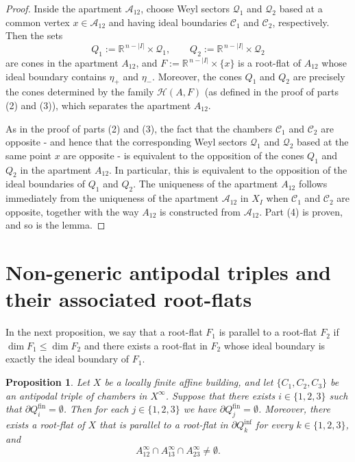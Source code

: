 \documentclass[11pt]{amsart}
\theoremstyle{plain}
\newtheorem{prop}[thm]{Proposition}
\theoremstyle{definition}
\theoremstyle{remark}
\begin{document}
\begin{proof}
		Inside the apartment $\mathcal{A}_{12}$, choose Weyl sectors  $\mathcal{Q}_{1}$ and $\mathcal{Q}_{2}$ based at a common vertex $x \in \mathcal{A}_{12}$ and having ideal boundaries $\mathcal{C}_{1}$ and $\mathcal{C}_{2}$, respectively.  
		Then the sets
		\[
		Q_{1} := \mathbb{R}^{\,n - |I|} \times \mathcal{Q}_{1},
		\qquad
		Q_{2} := \mathbb{R}^{\,n - |I|} \times \mathcal{Q}_{2}
		\]
		are cones in the apartment $A_{12}$, and
		\(
		F := \mathbb{R}^{\,n - |I|} \times \{x\}
		\)
		is a root-flat of $A_{12}$ whose ideal boundary contains 
		$\eta_{+}$ and $\eta_{-}$.  Moreover, the cones $Q_{1}$ and $Q_{2}$ are precisely the cones determined by the family $\mathcal{H}(A,F)$ (as defined in the proof of parts (2) and (3)), which separates the apartment $A_{12}$. 
		
		As in the proof of parts (2) and (3), the fact that the chambers $\mathcal{C}_{1}$ and $\mathcal{C}_{2}$ are opposite - and hence that the corresponding Weyl sectors $\mathcal{Q}_{1}$ and $\mathcal{Q}_{2}$ based at the same point $x$ are opposite - is equivalent to the opposition of the cones $Q_{1}$ and $Q_{2}$ in the apartment $A_{12}$. In particular, this is equivalent to the opposition of the ideal boundaries of $Q_1$ and $Q_2$. The uniqueness of the apartment $A_{12}$ follows immediately from the uniqueness of the apartment $\mathcal{A}_{12}$ in $X_{I}$ when $\mathcal{C}_{1}$ and 
		$\mathcal{C}_{2}$ are opposite, together with the way $A_{12}$ is constructed from $\mathcal{A}_{12}$. Part (4) is proven, and so is the lemma.
	\end{proof}
	
	
	
	\section{Non-generic antipodal triples and their associated root-flats}
	In the next proposition, we say that a root-flat \( F_1 \) is parallel to a root-flat \( F_2 \) if \( \dim F_1 \leq \dim F_2 \) and there exists a root-flat in \( F_2 \) whose ideal boundary is exactly the ideal boundary of \( F_1 \).
	
	\begin{prop}
		\label{prop::non_generic_flats}
		Let $X$ be a locally finite affine building, and let $\{C_1, C_2, C_3\}$ be an antipodal triple of chambers in $X^\infty$.
		Suppose that there exists $i \in \{1,2,3\}$ such that  $\partial Q_{i}^{\mathrm{fin}} = \emptyset$.
		Then for each $j \in \{1,2,3\}$ we have $\partial Q_{j}^{\mathrm{fin}} = \emptyset$.
		Moreover, there exists a root-flat of $X$ that is parallel to a root-flat in $\partial Q_{k}^{\mathrm{inf}}$ for every $k \in \{1,2,3\}$, and
		\[
		A_{12}^{\infty} \cap A_{13}^{\infty} \cap A_{23}^{\infty} \neq \emptyset.
		\]
	\end{prop}
	
\end{document}
